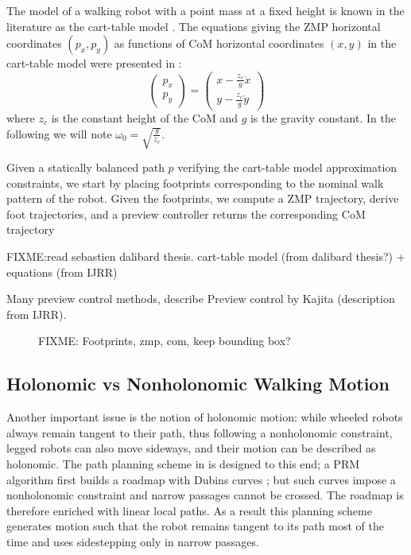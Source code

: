 The model of a walking robot with a point mass at a fixed height is
known in the literature as the cart-table model
\cite{kaji03}.  The equations giving the ZMP horizontal
coordinates $(p_x,p_y)$ as functions of CoM horizontal coordinates
$(x,y)$ in the cart-table model were presented in
\cite{kaji03}:
\begin{equation}
\label{eq:walk-zmp}
\left(
\begin{array}{c}
p_x\\ p_y
\end{array}
\right) = \displaystyle \left(
\begin{array}{c}
x - \frac{z_c}{g} \ddot{x}\\ y - \frac{z_c}{g} \ddot{y}
\end{array}
\right)
\end{equation}
where $z_c$ is  the constant height of the CoM and  $g$ is the gravity
constant.    In    the    following    we    will    note    $\omega_0
=\sqrt{\frac{g}{z_c}}$.

Given a statically balanced path $p$ verifying the cart-table model
approximation constraints, we start by placing footprints
corresponding to the nominal walk pattern of the robot. Given the
footprints, we compute a ZMP trajectory, derive foot trajectories, and
a preview controller returns the corresponding CoM trajectory

FIXME:read sebastien dalibard thesis.
cart-table model (from dalibard thesis?) + equations (from IJRR)

Many preview control methods, describe Preview control by Kajita
(description from IJRR).

\begin{figure}
  \centering
  
  \caption{FIXME: Footprints, zmp, com, keep bounding box?}
  \label{fig:chap1-zmp}
\end{figure}

\subsection{Holonomic vs Nonholonomic Walking Motion}
\label{subsec:chap1-holonomic}

Another important issue is the notion of holonomic motion: while
wheeled robots always remain tangent to their path, thus following a
nonholonomic constraint, legged robots can also move sideways, and
their motion can be described as holonomic. The path planning scheme
in \cite{yosh08} is designed to this end; a PRM algorithm first builds
a roadmap with Dubins curves \cite{dubi57}; but such curves impose a
nonholonomic constraint and narrow passages cannot be crossed. The
roadmap is therefore enriched with linear local paths. As a result
this planning scheme generates motion such that the robot remains
tangent to its path most of the time and uses sidestepping only in
narrow passages.

